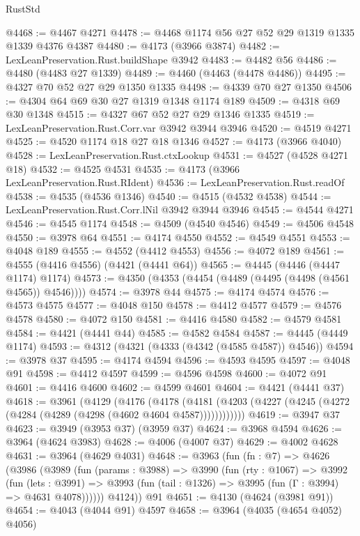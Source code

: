 \begin{lexlean}{RustStd}
\begin{coremodule}
{\begin{coremodule}
{{{{{{{{{{{{{{{{{{{{{{{{{{{{{{{{{{{{{{@4468 := @4467 @4271
@4478 := @4468 @1174 @56 @27 @52 @29 @1319 @1335 @1339 @4376 @4387
@4480 := @4173 (@3966 @3874)
@4482 := LexLeanPreservation.Rust.buildShape @3942
@4483 := @4482 @56
@4486 := @4480 (@4483 @27 @1339)
@4489 := @4460 (@4463 (@4478 @4486))
@4495 := @4327 @70 @52 @27 @29 @1350 @1335
@4498 := @4339 @70 @27 @1350
@4506 := @4304 @64 @69 @30 @27 @1319 @1348 @1174 @189
@4509 := @4318 @69 @30 @1348
@4515 := @4327 @67 @52 @27 @29 @1346 @1335
@4519 := LexLeanPreservation.Rust.Corr.var @3942 @3944 @3946
@4520 := @4519 @4271
@4525 := @4520 @1174 @18 @27 @18 @1346
@4527 := @4173 (@3966 @4040)
@4528 := LexLeanPreservation.Rust.ctxLookup
@4531 := @4527 (@4528 @4271 @18)
@4532 := @4525 @4531
@4535 := @4173 (@3966 LexLeanPreservation.Rust.RIdent)
@4536 := LexLeanPreservation.Rust.readOf
@4538 := @4535 (@4536 @1346)
@4540 := @4515 (@4532 @4538)
@4544 := LexLeanPreservation.Rust.Corr.lNil @3942 @3944 @3946
@4545 := @4544 @4271
@4546 := @4545 @1174
@4548 := @4509 (@4540 @4546)
@4549 := @4506 @4548
@4550 := @3978 @64
@4551 := @4174 @4550
@4552 := @4549 @4551
@4553 := @4048 @189
@4555 := @4552 (@4412 @4553)
@4556 := @4072 @189
@4561 := @4555 (@4416 @4556) (@4421 (@4441 @64))
@4565 := @4445 (@4446 (@4447 @1174) @1174)
@4573 := @4350 (@4353 (@4454 (@4489 (@4495 (@4498 (@4561 @4565)) @4546))))
@4574 := @3978 @44
@4575 := @4174 @4574
@4576 := @4573 @4575
@4577 := @4048 @150
@4578 := @4412 @4577
@4579 := @4576 @4578
@4580 := @4072 @150
@4581 := @4416 @4580
@4582 := @4579 @4581
@4584 := @4421 (@4441 @44)
@4585 := @4582 @4584
@4587 := @4445 (@4449 @1174)
@4593 := @4312 (@4321 (@4333 (@4342 (@4585 @4587)) @4546))
@4594 := @3978 @37
@4595 := @4174 @4594
@4596 := @4593 @4595
@4597 := @4048 @91
@4598 := @4412 @4597
@4599 := @4596 @4598
@4600 := @4072 @91
@4601 := @4416 @4600
@4602 := @4599 @4601
@4604 := @4421 (@4441 @37)
@4618 := @3961
    (@4129
      (@4176
        (@4178
          (@4181 (@4203 (@4227 (@4245 (@4272 (@4284 (@4289 (@4298 (@4602 @4604 @4587))))))))))))
@4619 := @3947 @37
@4623 := @3949 (@3953 @37) (@3959 @37)
@4624 := @3968 @4594
@4626 := @3964 (@4624 @3983)
@4628 := @4006 (@4007 @37)
@4629 := @4002 @4628
@4631 := @3964 (@4629 @4031)
@4648 := @3963
    (fun (fn : @7) =>
    @4626
      (@3986
        (@3989
          (fun (params : @3988) =>
          @3990
            (fun (rty : @1067) =>
            @3992
              (fun (lets : @3991) =>
              @3993 (fun (tail : @1326) => @3995 (fun (Γ : @3994) => @4631 @4078))))))
        @4124))
    @91
@4651 := @4130 (@4624 (@3981 @91))
@4654 := @4043 (@4044 @91) @4597
@4658 := @3964 (@4035 (@4654 @4052) @4056)
}}}}}}}}}}}}}}}}}}}}}}}}}}}}}}}}}}}}}}
\end{coremodule}}
\end{coremodule}
\end{lexlean}
